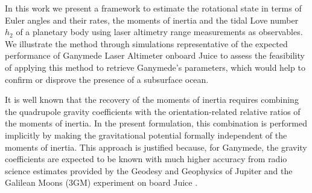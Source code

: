 \documentclass[pdflatex,sn-mathphys-num]{sn-jnl}%
\theoremstyle{thmstyleone}%
\theoremstyle{thmstyletwo}%
\theoremstyle{thmstylethree}%
\begin{document}



In this work we present a framework to estimate the rotational state in terms of Euler angles and their rates, the moments of inertia and the tidal Love number $h_2$ of a planetary body using laser altimetry range measurements as observables. 
%
We illustrate the method through simulations representative of the expected performance of Ganymede Laser Altimeter \citep[GALA;][]{2025SSRv..221...33H, 2022AdSpR..69.2283E,2019JSAST..17..234K} onboard Juice to assess the feasibility of applying this method to retrieve Ganymede's parameters, which would help to confirm or disprove the presence of a subsurface ocean. 

It is well known \citep[see, e.g.,][]{2014JGRE..119.1546W} that the recovery of the moments of inertia requires combining the quadrupole gravity coefficients with the orientation-related relative ratios of the moments of inertia. 
%
In the present formulation, this combination is performed implicitly by making the gravitational potential formally independent of the moments of inertia. This approach is justified because, for Ganymede, the gravity coefficients are expected to be known with much higher accuracy from radio science estimates provided by the Geodesy and Geophysics of Jupiter and the Galilean Moons (3GM) experiment on board Juice \citep[][]{2020P&SS..18704902C}.
\end{document}
